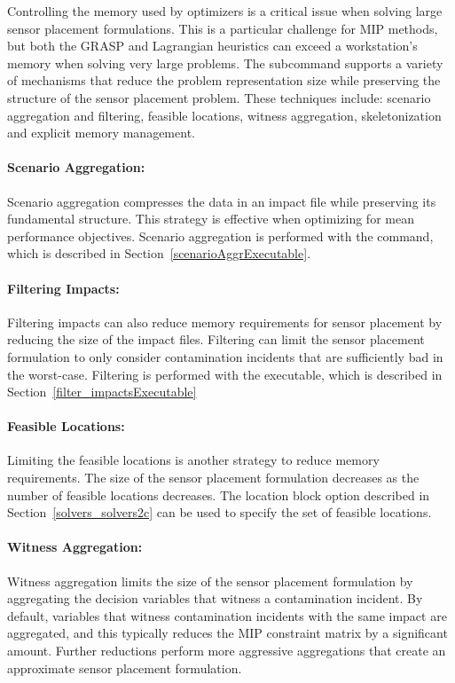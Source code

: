 Controlling the memory used by optimizers is a critical issue when
solving large sensor placement formulations. This is a particular
challenge for MIP methods, but both the GRASP and Lagrangian
heuristics can exceed a workstation's memory when solving very large
problems. The  subcommand supports a variety of mechanisms
that reduce the problem representation size while preserving the
structure of the sensor placement problem. These techniques include:
scenario aggregation and filtering, feasible locations, witness
aggregation, skeletonization and explicit memory management.

\paragraph{Scenario Aggregation:}
Scenario aggregation compresses the data in an impact file while
preserving its fundamental structure. This strategy is effective
when optimizing for mean performance objectives. Scenario aggregation
is performed with the  command, which is described
in Section~\ref{scenarioAggrExecutable}.

\paragraph{Filtering Impacts:}
Filtering impacts can also reduce memory requirements for sensor
placement by reducing the size of the impact files. Filtering can
limit the sensor placement formulation to only consider contamination
incidents that are sufficiently bad in the worst-\/case. Filtering
is performed with the  executable, which
is described in Section~\ref{filter_impactsExecutable}

\paragraph{Feasible Locations:}
Limiting the feasible locations is another strategy to reduce memory
requirements. The size of the sensor placement formulation
decreases as the number of feasible locations decreases. The
location block option described in Section~\ref{solvers_solvers2c}
can be used to specify the set of feasible locations.

\paragraph{Witness Aggregation:}
Witness aggregation limits the size of the sensor placement formulation
by aggregating the decision variables that witness a contamination
incident. By default, variables that witness contamination incidents
with the same impact are aggregated, and this typically reduces the
MIP constraint matrix by a significant amount. Further reductions
perform more aggressive aggregations that create an approximate
sensor placement formulation.

